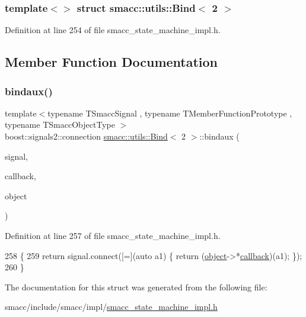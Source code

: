 \subsubsection*{template$<$$>$\newline
struct smacc\+::utils\+::\+Bind$<$ 2 $>$}



Definition at line 254 of file smacc\+\_\+state\+\_\+machine\+\_\+impl.\+h.



\subsection{Member Function Documentation}
\mbox{\label{structsmacc_1_1utils_1_1Bind_3_012_01_4_aa9bba43cc8862f00155b17d2625bd99e}} 
\subsubsection{\texorpdfstring{bindaux()}{bindaux()}}
{\footnotesize\ttfamily template$<$typename T\+Smacc\+Signal , typename T\+Member\+Function\+Prototype , typename T\+Smacc\+Object\+Type $>$ \\
boost\+::signals2\+::connection \hyperlink{structsmacc_1_1utils_1_1Bind}{smacc\+::utils\+::\+Bind}$<$ 2 $>$\+::bindaux (\begin{DoxyParamCaption}\item[{T\+Smacc\+Signal \&}]{signal,  }\item[{T\+Member\+Function\+Prototype}]{callback,  }\item[{T\+Smacc\+Object\+Type $\ast$}]{object }\end{DoxyParamCaption})\hspace{0.3cm}{\ttfamily [inline]}}



Definition at line 257 of file smacc\+\_\+state\+\_\+machine\+\_\+impl.\+h.


\begin{DoxyCode}
258   \{
259     \textcolor{keywordflow}{return} signal.connect([=](\textcolor{keyword}{auto} a1) \{ \textcolor{keywordflow}{return} (\hyperlink{classobject}{object}->*\hyperlink{servers_2opencv__perception__node_2opencv__perception__node_8cpp_a050e697bd654facce10ea3f6549669b3}{callback})(a1); \});
260   \}
\end{DoxyCode}


The documentation for this struct was generated from the following file\+:\begin{DoxyCompactItemize}
\item 
smacc/include/smacc/impl/\hyperlink{smacc__state__machine__impl_8h}{smacc\+\_\+state\+\_\+machine\+\_\+impl.\+h}\end{DoxyCompactItemize}
